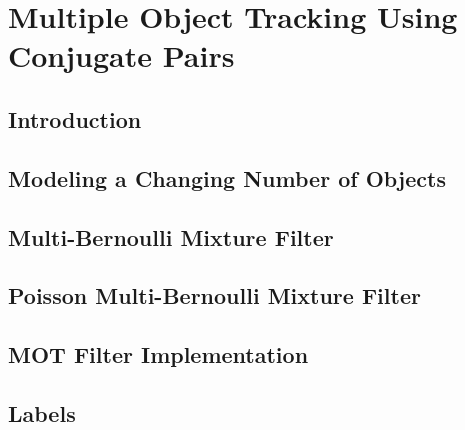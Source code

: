 \documentclass{beamer}
\begin{document}
	\section{Multiple Object Tracking Using Conjugate Pairs}
	\subsection{Introduction}
	\subsection{Modeling a Changing Number of Objects}
	\subsection{Multi-Bernoulli Mixture Filter}
	\subsection{Poisson Multi-Bernoulli Mixture Filter}
	\subsection{MOT Filter Implementation}
	\subsection{Labels}	
\end{document}
